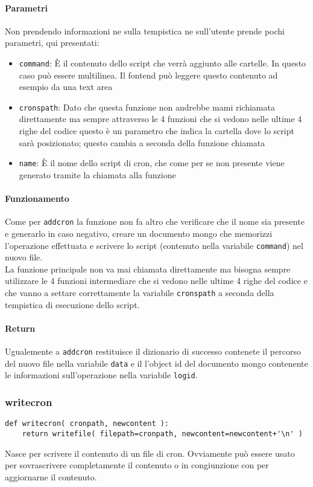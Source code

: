 \documentclass[11pt]{article}
\begin{document}
\paragraph{Parametri}
Non prendendo informazioni ne sulla tempistica ne sull'utente prende pochi parametri, qui presentati:
\begin{itemize}
	\item{\texttt{command}: È il contenuto dello script che verrà aggiunto alle cartelle. In questo
		caso può essere multilinea. Il fontend può leggere questo contenuto ad esempio da una text area}
	\item{\texttt{cronspath}: Dato che questa funzione non andrebbe mami richiamata direttamente ma sempre
		attraverso le 4 funzioni che si vedono nelle ultime 4 righe del codice questo è un parametro
		che indica la cartella dove lo script sarà posizionato; questo cambia a seconda della funzione chiamata}
	\item{\texttt{name}: È il nome dello script di cron, che come per  se non presente viene
		generato tramite la chiamata alla funzione }
\end{itemize}
\paragraph{Funzionamento}
Come per \texttt{addcron} la funzione non fa altro che verificare che il nome sia presente e generarlo in caso negativo,
creare un documento mongo che memorizzi l'operazione effettuata e scrivere lo script (contenuto nella variabile \texttt{command})
nel nuovo file.\\
La funzione principale non va mai chiamata direttamente ma bisogna sempre utilizzare le 4 funzioni intermediare che si vedono
nelle ultime 4 righe del codice e che vanno a settare correttamente la variabile \texttt{cronspath} a seconda della tempistica
di esecuzione dello script.
\paragraph{Return}
Ugualemente a \texttt{addcron} restituisce il dizionario di successo contenete il percorso del nuovo file
nella variabile \texttt{data} e il l'object id del documento mongo contenente le informazioni sull'operazione
nella variabile \texttt{logid}.

\subsubsection{writecron}\label{writecron}
\begin{lstlisting}
def writecron( cronpath, newcontent ):
    return writefile( filepath=cronpath, newcontent=newcontent+'\n' )
\end{lstlisting}
Nasce per scrivere il contenuto di un file di cron. Ovviamente può essere usato per sovrascrivere completamente il contenuto
o in congiunzione con  per aggiornarne il contenuto.
\end{document}

